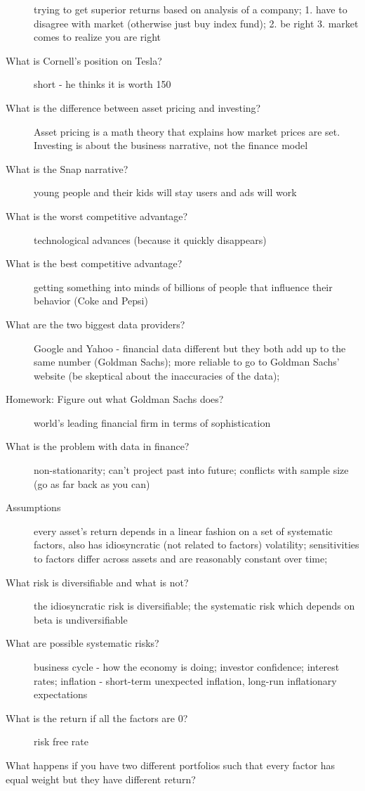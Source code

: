 \documentclass[11pt]{article}
\begin{document}
\begin{description}
  trying to get superior returns based on analysis of a company;
  1. have to disagree with market (otherwise just buy index fund);
  2. be right
  3. market comes to realize you are right
\item[What is Cornell's position on Tesla?]
  short - he thinks it is worth 150
\item[What is the difference between asset pricing and investing?]
  Asset pricing is a math theory that explains how market prices are set.
  Investing is about the business narrative, not the finance model
\item[What is the Snap narrative?]
  young people and their kids will stay users and ads will work
\item[What is the worst competitive advantage?]
  technological advances (because it quickly disappears)
\item[What is the best competitive advantage?]
  getting something into minds of billions of people that influence their behavior (Coke and Pepsi)
\item[What are the two biggest data providers?]
  Google and Yahoo - financial data different but they both add up to the same number (Goldman Sachs);
  more reliable to go to Goldman Sachs' website (be skeptical about the inaccuracies of the data);
\item[Homework: Figure out what Goldman Sachs does?]
  world's leading financial firm in terms of sophistication
\item[What is the problem with data in finance?]
  non-stationarity; can't project past into future;
  conflicts with sample size (go as far back as you can)
\item[Assumptions]
  every asset's return depends in a linear fashion on a set of systematic factors, also has idiosyncratic (not related to factors) volatility;
  sensitivities to factors differ across assets and are reasonably constant over time;
\item[What risk is diversifiable and what is not?]
  the idiosyncratic risk is diversifiable;
  the systematic risk which depends on beta is undiversifiable
\item[What are possible systematic risks?]
  business cycle - how the economy is doing;
  investor confidence;
  interest rates;
  inflation - short-term unexpected inflation, long-run inflationary expectations
\item[What is the return if all the factors are 0?]
  risk free rate
\item[What happens if you have two different portfolios such that every factor has equal weight but they have different return?]

\end{description}
\end{document}
